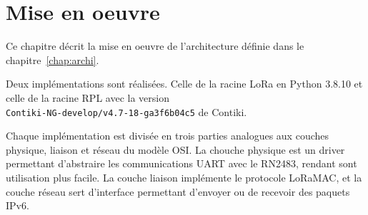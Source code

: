\renewcommand{\leftmark}{MISE EN OEUVRE}
\chapter{Mise en oeuvre}\label{chap:work}
    Ce chapitre décrit la mise en oeuvre de l'architecture définie dans le
    chapitre~\ref{chap:archi}.

    Deux implémentations sont réalisées. Celle de la racine LoRa en Python 3.8.10 et celle de la racine RPL avec la version\\ \texttt{Contiki-NG-develop/v4.7-18-ga3f6b04c5} de Contiki.

    Chaque implémentation est divisée en trois parties analogues aux couches physique, liaison et réseau du modèle OSI. La chouche physique est un driver permettant d'abstraire les communications UART avec le RN2483, rendant sont utilisation plus facile. La couche liaison implémente le protocole LoRaMAC, et la couche réseau sert d'interface permettant d'envoyer ou de recevoir des paquets IPv6.

%